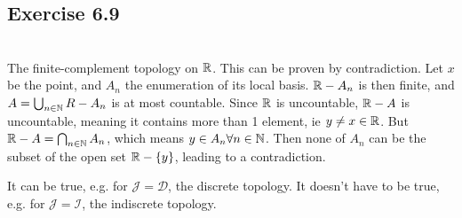 \subsection{Exercise 6.9} %
\setcounter{question}{0}


\begin{solution}
 \\The finite-complement topology on $\mathbb{R}$. This can be proven by contradiction. Let $x$ be the point, and $A_n$ the enumeration of its local basis. $\mathbb{R} - A_n$ is then finite, and $A = \bigcup_{n \in \mathbb{N}} R - A_n$ is at most countable. Since $\mathbb{R}$ is uncountable, $\mathbb{R} - A$ is uncountable, meaning it contains more than 1 element, ie $y \neq x \in \mathbb{R}$. But $\mathbb{R} - A = \bigcap_{n \in \mathbb{N}} A_n$, which means $y \in A_n \forall n \in \mathbb{N}$. Then none of $A_n$ can be the subset of the open set $\mathbb{R} - \{y\}$, leading to a contradiction.
\end{solution}


\begin{solution}
 It can be true, e.g. for $\mathcal{J} = \mathcal{D}$, the discrete topology. It doesn't have to be true, e.g. for $\mathcal{J} = \mathcal{I}$, the indiscrete topology.
\end{solution}

\question{}

